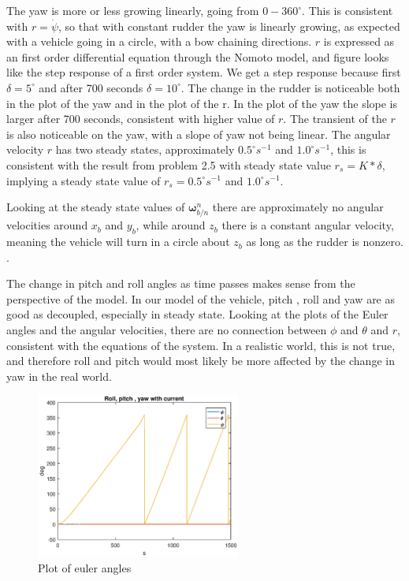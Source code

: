 The yaw is more or less growing linearly, going from $0-360 ^\circ$. This is consistent with $r = \dot{\psi}$, so that with constant rudder the yaw is linearly growing, as expected with a vehicle going in a circle, with a bow chaining directions. $r$ is expressed as an first order differential equation through the Nomoto model, and  figure  looks like the step response of a first order system. We get a step response because first $\delta = 5^\circ$ and after 700 seconds $\delta = 10^\circ$.  The change in the rudder is noticeable both in the plot of the yaw and in the plot of the r. In the plot of the yaw the slope is larger after 700 seconds, consistent with higher value of $r$. The transient of the $r$ is also noticeable on the yaw, with a slope of yaw not being linear. The angular velocity $r$ has two steady states, approximately  $0.5^\circ s^{-1}$  and $1.0^\circ s^{-1}$, this is consistent with the result from problem 2.5 with steady state value $r_s = K*\delta$, implying a steady state value of $r_s = 0.5^\circ s^{-1}$ and $1.0^\circ s^{-1}$. 

Looking at the steady state values of $\boldsymbol{\omega}^n_{b/n}$ there are approximately no angular velocities around $x_b$ and $y_b$, while around $z_b$ there is a constant angular velocity, meaning the vehicle will turn in a circle about $z_b$ as long as the rudder is nonzero. .

The change in pitch and roll angles as time passes makes sense from the perspective of the model. In our model of the vehicle, pitch , roll and yaw are as good as decoupled, especially in steady state. Looking at the plots of the Euler angles and the angular velocities, there are no connection between $\phi$ and $\theta$ and $r$, consistent with the equations of the system. In a realistic world, this is not true, and therefore roll and pitch would most likely be more affected by the change in yaw in the real world.


\begin{figure}[!ht]
	\centering
	\includegraphics[width=0.6\textwidth]{figures/2_6_ang.eps}
	\caption{Plot of euler angles}
	\label{fig:2_6_ang}
\end{figure}

